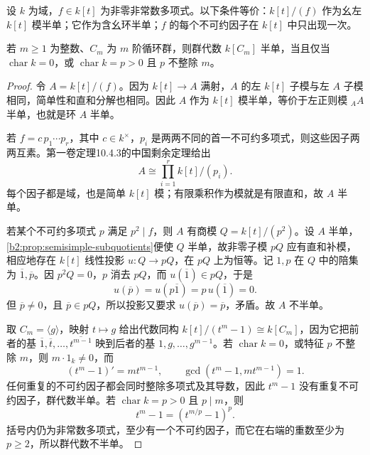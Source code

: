 \begin{proposition}\label{b2:prop:semisimple-cyclic-polynomial}
	设 \(k\) 为域，\(f\in k[t]\) 为非零非常数多项式。以下条件等价：\(k[t]/(f)\) 作为幺左 \(k[t]\) 模半单；它作为含幺环半单；\(f\) 的每个不可约因子在 \(k[t]\) 中只出现一次。

	若 \(m\ge1\) 为整数、\(C_m\) 为 \(m\) 阶循环群，则群代数 \(k[C_m]\) 半单，当且仅当 \(\operatorname{char}k=0\)，或 \(\operatorname{char}k=p>0\) 且 \(p\) 不整除 \(m\)。
\end{proposition}
\begin{proof}
	令 \(A=k[t]/(f)\)。因为 \(k[t]\to A\) 满射，\(A\) 的左 \(k[t]\) 子模与左 \(A\) 子模相同，简单性和直和分解也相同。因此 \(A\) 作为 \(k[t]\) 模半单，等价于左正则模 \({}_AA\) 半单，也就是环 \(A\) 半单。

	若 \(f=c\,p_1\cdots p_r\)，其中 \(c\in k^\times\)，\(p_i\) 是两两不同的首一不可约多项式，则这些因子两两互素。第一卷定理10.4.3的中国剩余定理给出
	\[
		A\cong\prod_{i=1}^r k[t]/(p_i).
	\]
	每个因子都是域，也是简单 \(k[t]\) 模；有限乘积作为模就是有限直和，故 \(A\) 半单。

	若某个不可约多项式 \(p\) 满足 \(p^2\mid f\)，则 \(A\) 有商模 \(Q=k[t]/(p^2)\)。设 \(A\) 半单，\cref{b2:prop:semisimple-subquotients}便使 \(Q\) 半单，故非零子模 \(pQ\) 应有直和补模，相应地存在 \(k[t]\) 线性投影 \(u:Q\to pQ\)，在 \(pQ\) 上为恒等。记 \(1,p\) 在 \(Q\) 中的陪集为 \(\overline1,\overline p\)。因 \(p^2Q=0\)，\(p\) 消去 \(pQ\)，而 \(u(\overline1)\in pQ\)，于是
	\[
		u(\overline p)=u(p\overline1)=p\,u(\overline1)=0.
	\]
	但 \(\overline p\ne0\)，且 \(\overline p\in pQ\)，所以投影又要求 \(u(\overline p)=\overline p\)，矛盾。故 \(A\) 不半单。

	取 \(C_m=\langle g\rangle\)，映射 \(t\mapsto g\) 给出代数同构 \(k[t]/(t^m-1)\cong k[C_m]\)，因为它把前者的基 \(\overline1,\overline t,\ldots,\overline{t^{m-1}}\) 映到后者的基 \(1,g,\ldots,g^{m-1}\)。若 \(\operatorname{char}k=0\)，或特征 \(p\) 不整除 \(m\)，则 \(m\cdot1_k\ne0\)，而
	\[
		(t^m-1)'=mt^{m-1}, \qquad \gcd(t^m-1,mt^{m-1})=1.
	\]
	任何重复的不可约因子都会同时整除多项式及其导数，因此 \(t^m-1\) 没有重复不可约因子，群代数半单。若 \(\operatorname{char}k=p>0\) 且 \(p\mid m\)，则
	\[
		t^m-1=(t^{m/p}-1)^p.
	\]
	括号内仍为非常数多项式，至少有一个不可约因子，而它在右端的重数至少为 \(p\ge2\)，所以群代数不半单。
\end{proof}
